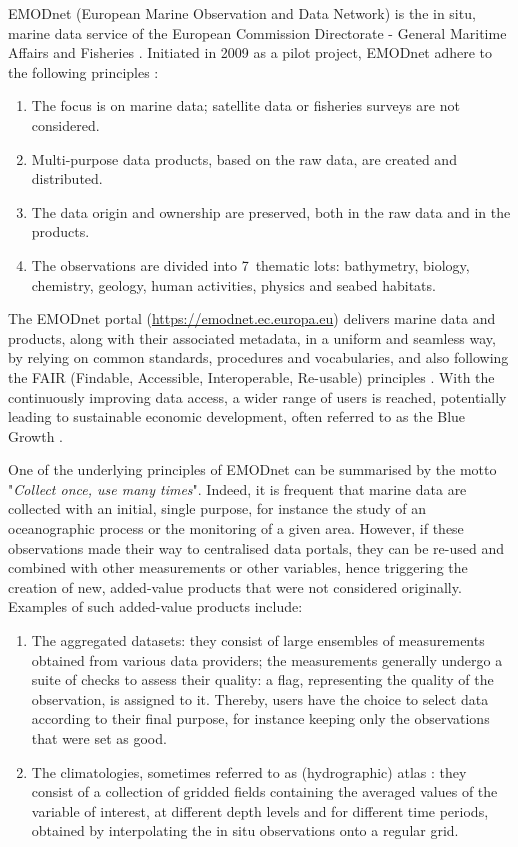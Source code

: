 \documentclass[essd, manuscript]{copernicus}
\begin{document}
\introduction 

EMODnet (European Marine Observation and Data Network) is the in situ, marine data service of the European Commission Directorate - General Maritime Affairs and Fisheries \citep{MartinMiguez2019}. Initiated in 2009 as a pilot project, EMODnet adhere to the following principles \citep{Shepherd2018}: 
\begin{enumerate}
\item The focus is on marine data; satellite data or fisheries surveys are not considered. 
\item Multi-purpose data products, based on the raw data, are created and distributed. 
\item The data origin and ownership are preserved, both in the raw data and in the products. 
\item The observations are divided into 7~thematic lots: bathymetry, biology, chemistry, geology, human activities, physics and seabed habitats. 
\end{enumerate} 

The EMODnet portal (\url{https://emodnet.ec.europa.eu}) delivers marine data and products, along with their associated metadata, in a uniform and seamless way, by relying on common standards, procedures and vocabularies, and also following the FAIR (Findable, Accessible, Interoperable, Re-usable) principles \citep {Wilkinson2016,Wilkinson2019}. With the continuously improving data access, a wider range of users is reached, potentially leading to sustainable economic development, often referred to as the Blue Growth \citep{Commission2012}. 

One of the underlying principles of EMODnet can be summarised by the motto "\textit{Collect once, use many times}". Indeed, it is frequent that marine data are collected with an initial, single purpose, for instance the study of an oceanographic process or the monitoring of a given area. However, if these observations made their way to centralised data portals, they can be re-used and combined with other measurements or other variables, hence triggering the creation of new, added-value products that were not considered originally. Examples of such added-value products include:
\begin{enumerate}
\item The aggregated datasets: they consist of large ensembles of measurements obtained from various data providers; the measurements generally undergo a suite of checks to assess their quality: a flag, representing the quality of the observation, is assigned to it. Thereby, users have the choice to select data according to their final purpose, for instance keeping only the observations that were set as good.
\item The climatologies, sometimes referred to as (hydrographic) atlas \citep[e.g.][]{soton16209,Iona_2018}: they consist of a collection of gridded fields containing the averaged values of the variable of interest, at different depth levels and for different time periods, obtained by interpolating the in situ observations onto a regular grid.
\end{enumerate}
\end{document}
